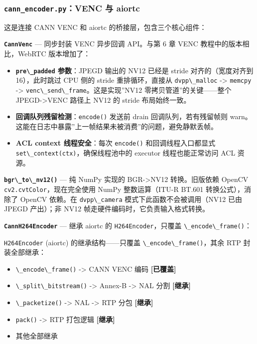 \subsubsection{\texorpdfstring{\texttt{cann\_encoder.py}：VENC 与
aiortc}{cann\_encoder.py：VENC 与 aiortc}}\label{src-book-chapter6-h151}

这是连接 CANN VENC 和 aiortc 的桥接层，包含三个核心组件：

\textbf{\passthrough{\lstinline!CannVenc!}} --- 同步封装 VENC 异步回调
API。与第 6 章 VENC 教程中的版本相比，WebRTC 版本增加了：

\begin{itemize}
\tightlist
\item
  \textbf{\passthrough{\lstinline!pre\_padded!} 参数}：JPEGD 输出的 NV12
  已经是 stride 对齐的（宽度对齐到 16），此时跳过 CPU 侧的 stride
  重排循环，直接从 \passthrough{\lstinline!dvpp\_malloc!}
  -\textgreater{} \passthrough{\lstinline!memcpy!} -\textgreater{}
  \passthrough{\lstinline!venc\_send\_frame!}。这是实现''NV12
  零拷贝管道''的关键------整个 JPEGD-\textgreater VENC 路径上 NV12 的
  stride 布局始终一致。
\item
  \textbf{回调队列残留检测}：\passthrough{\lstinline!encode()!} 发送前
  drain 回调队列，若有残留帧则
  warn。这能在日志中暴露''上一帧结果未被消费''的问题，避免静默丢帧。
\item
  \textbf{ACL context 线程安全}：每次 \passthrough{\lstinline!encode()!}
  和回调线程入口都显式
  \passthrough{\lstinline!set\_context(ctx)!}，确保线程池中的 executor
  线程也能正常访问 ACL 资源。
\end{itemize}

\textbf{\passthrough{\lstinline!bgr\_to\_nv12()!}} --- 纯 NumPy 实现的
BGR-\textgreater NV12 转换。旧版依赖 OpenCV
\passthrough{\lstinline!cv2.cvtColor!}，现在完全使用 NumPy
整数运算（ITU-R BT.601 转换公式），消除了 OpenCV 依赖。在
\passthrough{\lstinline!dvpp\_camera!} 模式下此函数不会被调用（NV12 已由
JPEGD 产出）；非 NV12 帧走硬件编码时，它负责输入格式转换。

\textbf{\passthrough{\lstinline!CannH264Encoder!}} --- 继承 aiortc 的
\passthrough{\lstinline!H264Encoder!}，只覆盖
\passthrough{\lstinline!\_encode\_frame()!}：

\passthrough{\lstinline!H264Encoder!} (aiortc) 的继承结构------只覆盖
\passthrough{\lstinline!\_encode\_frame()!}，其余 RTP 封装全部继承：

\begin{itemize}
\tightlist
\item
  \passthrough{\lstinline!\_encode\_frame()!} -\textgreater{} CANN VENC
  编码 \textbf{{[}已覆盖{]}}
\item
  \passthrough{\lstinline!\_split\_bitstream()!} -\textgreater{} Annex-B
  -\textgreater{} NAL 分割 \textbf{{[}继承{]}}
\item
  \passthrough{\lstinline!\_packetize()!} -\textgreater{} NAL
  -\textgreater{} RTP 分包 \textbf{{[}继承{]}}
\item
  \passthrough{\lstinline!pack()!} -\textgreater{} RTP 打包逻辑
  \textbf{{[}继承{]}}
\item
  其他全部继承
\end{itemize}

